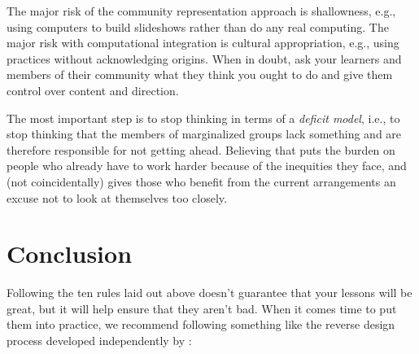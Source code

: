 \documentclass[10pt,letterpaper]{article}
\begin{document}
The major risk of the community representation approach is shallowness, e.g.,
using computers to build slideshows rather than do any real computing.  The
major risk with computational integration is cultural appropriation, e.g., using
practices without acknowledging origins. When in doubt, ask your learners and
members of their community what they think you ought to do and give them control
over content and direction.

The most important step is to stop thinking in terms of a \emph{deficit model},
i.e., to stop thinking that the members of marginalized groups lack something
and are therefore responsible for not getting ahead. Believing that puts the
burden on people who already have to work harder because of the inequities they
face, and (not coincidentally) gives those who benefit from the current
arrangements an excuse not to look at themselves too closely.

\section*{Conclusion}

Following the ten rules laid out above doesn't guarantee that your lessons will
be great, but it will help ensure that they aren't bad.  When it comes time to
put them into practice, we recommend following something like the reverse design
process developed independently by \cite{Wigg2005,Bigg2011,Fink2013}:
\end{document}
